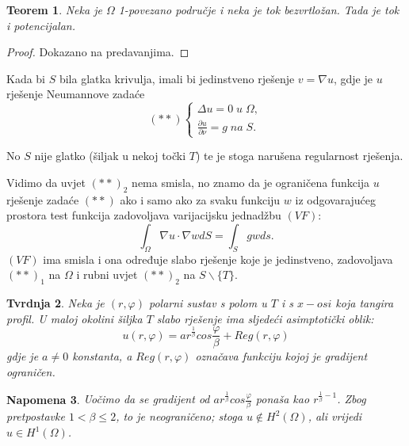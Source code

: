 \documentclass[a4paper,oneside,12pt]{memoir} %
\newtheorem{teorem}{Teorem}
\newtheorem{nap}[teorem]{Napomena}
\newtheorem{tvrdnja}[teorem]{Tvrdnja}
\begin{document}
\begin{teorem}
Neka je $\Omega$ 1-povezano područje i neka je tok bezvrtložan. Tada je tok i potencijalan.
\end{teorem}
\begin{proof}
Dokazano na predavanjima.
\end{proof}

Kada bi $S$ bila glatka krivulja, imali bi jedinstveno rješenje $v = \nabla u$, gdje je $u$ rješenje Neumannove zadaće
  \[
    (**) \left\{
                \begin{array}{ll}
                  \Delta u = 0 \; u \; \Omega, \\
                  \frac{\partial u}{\partial \nu} = g \; na \; S.
                \end{array}
              \right.
  \]

No $S$ nije glatko (šiljak u nekoj točki $T$) te je stoga narušena regularnost rješenja.

Vidimo da uvjet $(**)_2$ nema smisla, no znamo da je ograničena funkcija $u$ rješenje zadaće $(**)$ ako i samo ako za svaku funkciju $w$ iz odgovarajućeg prostora test funkcija zadovoljava varijacijsku jednadžbu $(VF)$:
\begin{equation*}
\int_\Omega \nabla u \cdot \nabla w dS = \int_S gw ds.
\end{equation*}
$(VF)$ ima smisla i ona određuje slabo rješenje koje je jedinstveno, zadovoljava $(**)_1$ na $\Omega$ i rubni uvjet $(**)_2$ na $S\backslash \{T\}$.




\begin{tvrdnja} \label{tv:3}
Neka je $(r, \varphi)$ polarni sustav s polom u $T$ i s $x-osi$ koja tangira profil. U maloj okolini šiljka $T$ slabo rješenje ima sljedeći asimptotički oblik:
\begin{equation} \label{eq:1}
u(r, \varphi) = a r^{\frac{1}{\beta}} cos\frac{\varphi}{\beta} + Reg(r,\varphi)
\end{equation}
gdje je $a \neq 0$ konstanta, a $Reg(r, \varphi)$ označava funkciju kojoj je gradijent ograničen.
\end{tvrdnja}
\begin{nap}
Uočimo da se gradijent od $a r^{\frac{1}{\beta}} cos\frac{\varphi}{\beta}$ ponaša kao $r^{\frac{1}{\beta}-1}$. Zbog pretpostavke $1 < \beta \leq 2$, to je neograničeno; stoga $u \notin H^2(\Omega)$, ali vrijedi $u \in H^1(\Omega)$.
\end{nap}
\end{document}
